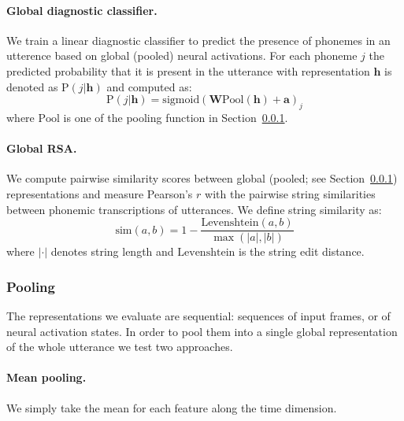 \paragraph{Global diagnostic classifier.}
We train a linear diagnostic classifier to predict the presence of phonemes
in an utterence based on global (pooled) neural activations.
For each phoneme $j$ the predicted probability that it is present in the
utterance with representation $\mathbf{h}$ is denoted as
$\mathrm{P}(j|\mathbf{h})$ and computed as:
\begin{equation}
  \label{eq:global_diagnostic}
   \mathrm{P}(j|\mathbf{h}) =  \mathrm{sigmoid}(\mathbf{W}\mathrm{\text{Pool}}(\mathbf{h})+\mathbf{a})_j
\end{equation}
where $\mathrm{Pool}$ is one of the pooling function in Section~\ref{sec:pooling}.


\paragraph{Global RSA.}
We compute pairwise similarity scores between global (pooled; see Section~\ref{sec:pooling})
representations and measure Pearson's $r$ with the pairwise string
similarities between phonemic transcriptions of
utterances. We define string similarity as:
\begin{equation}
  \mathrm{sim}(a, b) = 1 - \frac{\mathrm{Levenshtein}(a, b)}{\max(|a|, |b|)}
\end{equation}
where $|\cdot|$ denotes string length and $\mathrm{Levenshtein}$ is
the string edit distance.



\subsubsection{Pooling}
\label{sec:pooling}

The representations we evaluate are sequential: sequences of input
frames, or of neural activation states. In order to
pool them into a single global representation of the whole utterance
we test two approaches.
\paragraph{Mean pooling.} We simply take the mean for
each feature along the time dimension.
